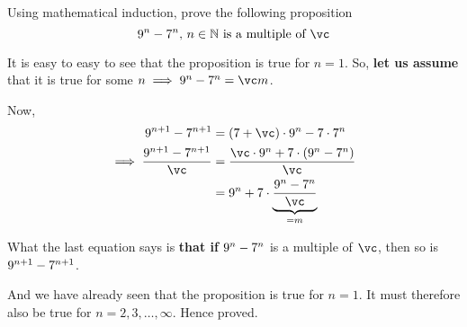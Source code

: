 

\SUBTRACT\va\vb\vc

\question Using mathematical induction, prove the following proposition
\[ \va^n-\vb^n,\,n\in\mathbb{N} \text{ is a multiple of }\vc \]

\insertQR{}

\watchout

\begin{solution}
  It is easy to easy to see that the proposition is true for $n=1$. 
  So, \textbf{let us assume} that it is true for some $n\implies\va^n-\vb^n=\vc m$.

  Now, 
  \begin{align}
    \va^{n+1} - \vb^{n+1} &= (\vb + \vc)\cdot\va^n - \vb\cdot\vb^n \\
    \implies\dfrac{\va^{n+1}-\vb^{n+1}}{\vc} &= \dfrac{\vc\cdot\va^n + \vb\cdot (\va^n - \vb^n)}{\vc} \\
    &= \va^n +\vb\cdot\underbrace{\dfrac{\va^n-\vb^n}{\vc}}_{= m}
  \end{align}

  What the last equation says is \textbf{ that if} $9^n-7^n$ is a multiple of $\vc$, then 
  so is $9^{n+1}-7^{n+1}$. 

  And we have already seen that the proposition is true for $n=1$. It must therefore also 
  be true for $n=2,3,\ldots,\infty$. Hence proved.
\end{solution}

